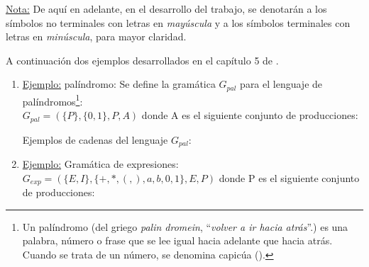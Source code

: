 \underline{Nota:}
De aquí en adelante, en el desarrollo del trabajo, se denotarán a los símbolos no terminales con letras en \textit{mayúscula} y a los símbolos terminales con letras en \textit{minúscula}, para mayor claridad.

A continuación dos ejemplos desarrollados en el capítulo 5 de \cite{gramatica}.

\begin{enumerate}
\item \underline{Ejemplo:} palíndromo:
Se define la gramática $G_{pal}$ para el lenguaje de palíndromos\footnote{Un palíndromo (del griego \textit{palin dromein}, ``\textit{volver a ir hacia atrás}''.) es una palabra, número o frase que se lee igual hacia adelante que hacia atrás. Cuando se trata de un número, se denomina capicúa ().}: \\
$G_{pal} = (\{P\},\{0,1\}, P, A)$
donde A es el siguiente conjunto de producciones:

Ejemplos de cadenas del lenguaje $G_{pal}$:

\item \underline{Ejemplo:} Gramática de expresiones:\\
\textbf{$G_{exp} = (\{E,I\}, \{+,*,(,),a,b,0,1\}, E, P)$} donde P es el siguiente conjunto de producciones:


\end{enumerate}
